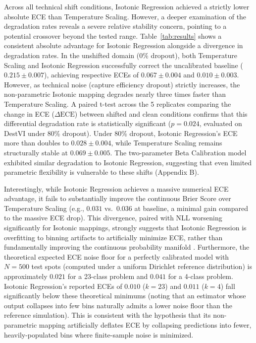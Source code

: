 \documentclass{jmlr} %
\begin{document}
Across all technical shift conditions, Isotonic Regression achieved a strictly lower absolute ECE than Temperature Scaling. However, a deeper examination of the degradation rates reveals a severe relative stability concern, pointing to a potential crossover beyond the tested range. Table~\ref{tab:results} shows a consistent absolute advantage for Isotonic Regression alongside a divergence in degradation rates. In the unshifted domain ($0\%$ dropout), both Temperature Scaling and Isotonic Regression successfully correct the uncalibrated baseline ($0.215 \pm 0.007$), achieving respective ECEs of $0.067 \pm 0.004$ and $0.010 \pm 0.003$. However, as technical noise (capture efficiency dropout) strictly increases, the non-parametric Isotonic mapping degrades nearly three times faster than Temperature Scaling. A paired t-test across the 5 replicates comparing the change in ECE ($\Delta \text{ECE}$) between shifted and clean conditions confirms that this differential degradation rate is statistically significant ($p = 0.024$, evaluated on DestVI under 80\% dropout). Under $80\%$ dropout, Isotonic Regression's ECE more than doubles to $0.028 \pm 0.004$, while Temperature Scaling remains structurally stable at $0.069 \pm 0.005$. The two-parameter Beta Calibration model exhibited similar degradation to Isotonic Regression, suggesting that even limited parametric flexibility is vulnerable to these shifts (Appendix B).

Interestingly, while Isotonic Regression achieves a massive numerical ECE advantage, it fails to substantially improve the continuous Brier Score over Temperature Scaling (e.g., $0.031$ vs.\ $0.036$ at baseline, a minimal gain compared to the massive ECE drop). This divergence, paired with NLL worsening significantly for Isotonic mappings, strongly suggests that Isotonic Regression is overfitting to binning artifacts to artificially minimize ECE, rather than fundamentally improving the continuous probability manifold \citep{roelofs2022mitigating, kumar2019calibration}. Furthermore, the theoretical expected ECE noise floor for a perfectly calibrated model with $N=500$ test spots (computed under a uniform Dirichlet reference distribution) is approximately $0.021$ for a 23-class problem and $0.041$ for a 4-class problem. Isotonic Regression's reported ECEs of $0.010$ ($k=23$) and $0.011$ ($k=4$) fall significantly below these theoretical minimums (noting that an estimator whose output collapses into few bins naturally admits a lower noise floor than the reference simulation). This is consistent with the hypothesis that its non-parametric mapping artificially deflates ECE by collapsing predictions into fewer, heavily-populated bins where finite-sample noise is minimized.
\end{document}
